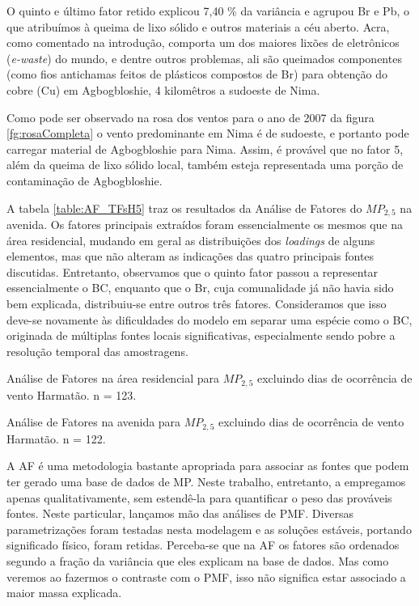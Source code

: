 O quinto e último fator retido explicou 7,40 \% da variância e agrupou
Br e Pb, o que atribuímos à queima de lixo sólido e outros materiais a céu 
aberto. Acra, como comentado na introdução, comporta um dos maiores lixões de 
eletrônicos (\textit{e-waste}) do mundo, e dentre outros problemas, ali são 
queimados componentes (como fios antichamas feitos de plásticos compostos de Br) 
para obtenção do cobre (Cu) em Agbogbloshie, 4 kilomêtros a sudoeste de Nima. 

Como pode ser observado na rosa dos ventos para o ano de 2007 da figura 
\ref{fg:rosaCompleta} o vento predominante em Nima é de sudoeste, 
e portanto pode carregar material de Agbogbloshie para Nima. 
Assim, é provável que no fator 5, além da queima de lixo sólido local, 
também esteja representada uma porção de contaminação de Agbogbloshie.

A tabela \ref{table:AF_TFsH5} traz os resultados da Análise de Fatores do 
$MP_{2,5}$ na avenida. Os fatores principais extraídos 
foram essencialmente os mesmos que na área residencial, mudando em geral as
distribuições dos \textit{loadings} de alguns elementos, mas que não alteram 
as indicações das quatro principais fontes discutidas. Entretanto, observamos 
que o quinto fator passou a representar essencialmente o BC, enquanto que o Br, 
cuja comunalidade já não havia sido bem explicada, distribuiu-se entre outros 
três fatores. Consideramos que isso deve-se novamente às dificuldades do modelo
em separar uma espécie como o BC, originada de múltiplas fontes locais 
significativas, especialmente sendo pobre a resolução temporal das amostragens.

\newpage
\begin{table}[H]
  \centering
  
  \caption{Análise de Fatores na área residencial para $MP_{2,5}$
           excluindo dias de ocorrência de vento Harmatão. n = 123.
          \label{table:AF_RFsH5}}
\end{table}

\begin{table}[H]
  \centering
  
  \caption{Análise de Fatores na avenida para $MP_{2,5}$
           excluindo dias de ocorrência de vento Harmatão. n = 122.
          \label{table:AF_TFsH5}}
\end{table}
\newpage

A AF é uma metodologia bastante apropriada para associar as fontes que podem 
ter gerado uma base de dados de MP. Neste trabalho, entretanto, a empregamos 
apenas qualitativamente, sem estendê-la para quantificar o peso das prováveis 
fontes. Neste particular, lançamos mão das análises de PMF. Diversas 
parametrizações foram testadas nesta modelagem e as soluções estáveis, portando 
significado físico, foram retidas. Perceba-se que na AF os fatores são ordenados
segundo a fração da variância que eles explicam na base de dados. 
Mas como veremos ao fazermos o contraste com o PMF, isso não significa estar 
associado a maior massa explicada.

